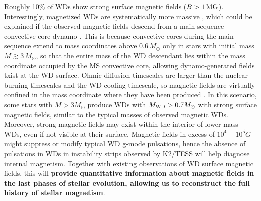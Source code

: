 
Roughly 10\% of WDs show strong surface magnetic fields ($B > 1 \, {\rm MG}$).
Interestingly, magnetized WDs are systematically more massive \cite{Ferrario_2015}, which could be explained if the observed magnetic fields descend from a main sequence convective core dynamo \cite{Cantiello_2016}. This is because convective cores during the main sequence extend to mass coordinates above $0.6 \, M_\odot$ only in stars with initial mass $M \! \gtrsim \! 3 \, M_\odot$, so that the entire mass of the WD descendant lies within the mass coordinate occupied by the MS convective core, allowing dynamo-generated fields txist at the WD surface. {\color{green} Ohmic diffusion timescales are larger than the nuclear burning timescales and the WD cooling timescale, so magnetic fields are virtually confined in the mass coordinate where they have been produced \cite{Cantiello_2016}.} In this scenario, some stars with $M>3M_\odot$ produce WDs with $M_{\rm WD}>0.7M_\odot$ with strong surface magnetic fields, similar to the typical masses of observed magnetic WDs. Moreover, strong magnetic fields may exist within the interior of lower mass WDs, even if not visible at their surface. Magnetic fields in excess of $10^4-10^5 G$ might suppress or modify typical WD g-mode pulsations, hence the absence of pulsations in WDs in instability strips observed by K2/TESS will help diagnose internal magnetism. Together with existing observations of WD surface magnetic fields, this will \textbf{provide quantitative information about magnetic fields in the last phases of stellar evolution, allowing us to reconstruct the full history of stellar magnetism}.